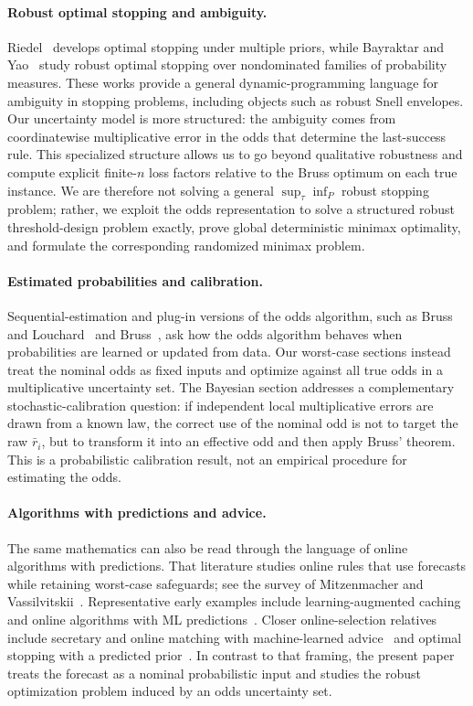 \documentclass[11pt,a4paper]{article}
\begin{document}
\paragraph{Robust optimal stopping and ambiguity.}
Riedel~\cite{Riedel2009} develops optimal stopping under multiple priors, while
Bayraktar and Yao~\cite{BayraktarYao2014} study robust optimal stopping over
nondominated families of probability measures.  These works provide a general
dynamic-programming language for ambiguity in stopping problems, including
objects such as robust Snell envelopes.  Our uncertainty model is more
structured: the ambiguity comes from coordinatewise multiplicative error in the
odds that determine the last-success rule.  This specialized structure allows us
to go beyond qualitative robustness and compute explicit finite-\(n\) loss
factors relative to the Bruss optimum on each true instance.  We are therefore
not solving a general \(\sup_\tau\inf_P\) robust stopping problem; rather, we
exploit the odds representation to solve a structured robust threshold-design
problem exactly, prove global deterministic minimax optimality, and formulate
the corresponding randomized minimax problem.

\paragraph{Estimated probabilities and calibration.}
Sequential-estimation and plug-in versions of the odds algorithm, such as Bruss
and Louchard~\cite{BrussLouchard2009} and Bruss~\cite{Bruss2019}, ask how the
odds algorithm behaves when probabilities are learned or updated from data.  Our
worst-case sections instead treat the nominal odds as fixed inputs and optimize
against all true odds in a multiplicative uncertainty set.  The Bayesian section
addresses a complementary stochastic-calibration question: if independent local
multiplicative errors are drawn from a known law, the correct use of the nominal
odd is not to target the raw \(\bar r_i\), but to transform it into an effective
odd and then apply Bruss' theorem.  This is a probabilistic calibration result,
not an empirical procedure for estimating the odds.

\paragraph{Algorithms with predictions and advice.}
The same mathematics can also be read through the language of online algorithms
with predictions.  That literature studies online rules that use forecasts while
retaining worst-case safeguards; see the survey of Mitzenmacher and
Vassilvitskii~\cite{MitzenmacherVassilvitskii2020}.  Representative early
examples include learning-augmented caching~\cite{LykourisVassilvitskii2018}
and online algorithms with ML predictions~\cite{PurohitSvitkinaKumar2018}.
Closer online-selection relatives include secretary and online matching with
machine-learned advice~\cite{AntoniadisGouleakisKleerKolev2023} and optimal
stopping with a predicted prior~\cite{BaiHuangLeeLi2025}.  In contrast to that
framing, the present paper treats the forecast as a nominal probabilistic input
and studies the robust optimization problem induced by an odds uncertainty set.
\end{document}
